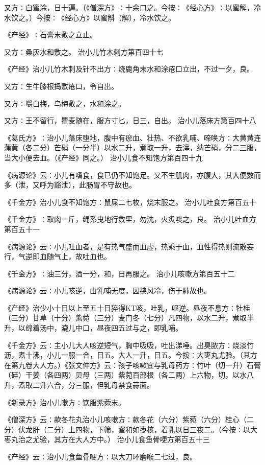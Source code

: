 \documentclass[a4paper,12pt,UTF8,twoside]{ctexbook}
\begin{document}
又方∶白蜜涂，日十遍。（《僧深方》∶十余口之。今按∶《经心方》∶以蜜解，冷水饮之。）今按∶《经心方》以蜜斛（解），冷水饮之。

《产经》∶石膏末敷之立止。

又方∶桑灰水和敷之。
治小儿竹木刺方第百四十七

《产经》治小儿竹木刺及针不出方∶烧鹿角末水和涂疮口立出，不过一夕，良。

又方∶生牛膝根捣敷疮口，令自出。

又方∶嚼白梅，乌梅敷之，水和涂之。

又方∶王不留行，瞿麦随在，服方寸匕，日三，自出。
治小儿落床方第百四十八

《葛氏方》∶治小儿落床堕地，腹中有瘀血、壮热、不欲乳哺、啼唤方∶大黄黄连蒲黄（各二分）芒硝（一分半）以水二升，煮取一升，去滓，纳芒硝，分二三服，当大小便去血。（《产经》同之。）
治小儿食不知饱方第百四十九

《病源论》云∶小儿有嗜食，食已仍不知饱足。又不生肌肉，亦腹大，其大便数而多（泄，又呼为豁泄），此肠胃不守故也。

《千金方》治小儿食不知饱方∶鼠屎二七枚，烧末服之。
治小儿吐食方第百五十

《千金方》∶取肉一斤，绳系曳地行数里，勿洗，火炙啖之，良。
治小儿吐血方第百五十一

《病源论》云∶小儿吐血者，是有热气盛而血虚，热乘于血，血性得热则流散妄行，气逆即血随气上，故吐血也。

《千金方》∶油三分，酒一分，和，日再服之。
治小儿咳嗽方第百五十二

《病源论》云∶小儿咳逆，由乳哺无度，因挟风冷，伤于肺故也。

《产经》治少小十日以上至五十日猝得KT咳，吐乳，呕逆。昼夜不息方∶牡桂（三分）甘草（十分）紫菀（三分）麦门冬（七分）凡四物，以水二升，煮取半升，以绵着汤中，漉儿中口，昼夜四五过与之，即乳哺。

《千金方》云∶主小儿大人咳逆短气，胸中吸吸，吐出涕唾。出臭脓方∶烧淡竹沥，煮十沸，小儿一服一合，日五。大人一升，日五。今按∶大枣丸尤验。（其方在第九卷大人方。）《张文仲方》云∶孩子咳嗽宜与乳母药方∶竹叶（切一升）石膏（碎）干姜（各四两）贝母（三两）紫菀百部根（各二两）上六物，切，以水八升，煮取二升六合，分三服，但乳母禁食蒜面。

《新录方》治小儿嗽方∶饮服紫菀末。

《僧深方》云∶款冬花丸治小儿咳嗽方∶款冬花（六分）紫菀（六分）桂心（二分）伏龙肝（二分）上四物，下筛，蜜和如枣核，着乳以日三夜二。（今按∶以大枣丸治之尤验，其方在大人方中。）
治小儿食鱼骨哽方第百五十三

《产经》云∶治小儿食鱼骨哽方∶以大刀环磨喉二七过，良。
\end{document}
